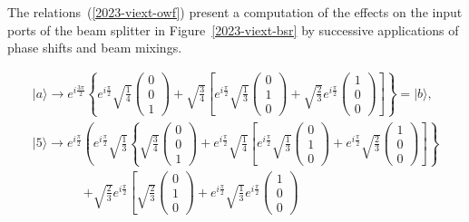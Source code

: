 \documentclass[%
 superscriptaddress,
  preprint,
 showpacs,
 showkeys,
 nofootinbib,
  amsmath,amssymb,
 pra,
  longbibliography,
  floatfix,
 ]{revtex4-2}
\theoremstyle{definition}
\begin{document}
The relations~(\ref{2023-viext-owf}) present a computation of the effects on the input ports of the beam splitter
in Figure~\ref{2023-viext-bsr} by successive applications of phase shifts and beam mixings.
\begin{widetext}
\begin{equation}
\begin{split}
\vert a \rangle
\longrightarrow
e^{i\frac{3\pi}{2}} \left\{
 e^{i\frac{\pi}{2}} \sqrt{\frac14}  \begin{pmatrix}0\\0\\1\end{pmatrix} +   \sqrt{\frac34}  \left[  e^{i\frac{\pi}{2}}  \sqrt{\frac13}  \begin{pmatrix}0\\1\\0\end{pmatrix} +    \sqrt{\frac23}    e^{i\frac{\pi}{2}} \begin{pmatrix}1\\0\\0\end{pmatrix} \right]
\right\} =  \vert b \rangle
,
\\
\vert 5 \rangle
\longrightarrow
 e^{i\frac{\pi}{2}} \left(
 e^{i\frac{\pi}{2}}  \sqrt{\frac13} \left\{
 \sqrt{\frac34}   \begin{pmatrix}0\\0\\1\end{pmatrix} +  e^{i\frac{\pi}{2}}  \sqrt{\frac14} \left[
                                            e^{i\frac{\pi}{2}}  \sqrt{\frac13}  \begin{pmatrix}0\\1\\0\end{pmatrix} +  e^{i\frac{\pi}{2}}  \sqrt{\frac23}  \begin{pmatrix}1\\0\\0\end{pmatrix}
                                           \right]
                      \right\}  \right.
\\ \qquad \qquad
\left.
+  \sqrt{\frac23}   e^{i\frac{\pi}{2}}  \left[   \sqrt{\frac23}  \begin{pmatrix}0\\1\\0\end{pmatrix} +  e^{i\frac{\pi}{2}}  \sqrt{\frac13}   e^{i\frac{\pi}{2}} \begin{pmatrix}1\\0\\0\end{pmatrix}

\end{split}
\end{equation}
\end{widetext}
\end{document}
